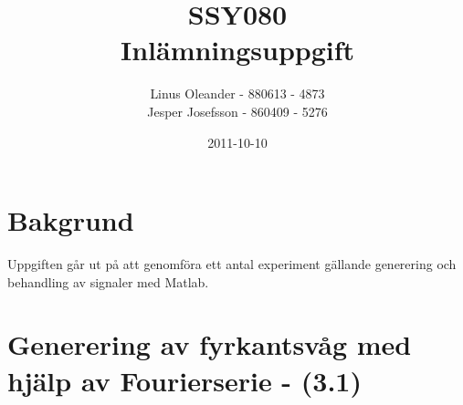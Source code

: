 \documentclass[]{article}
\title{SSY080 \\ Inlämningsuppgift}
\author{
Linus Oleander - 880613 - 4873 \\
Jesper Josefsson - 860409 - 5276 
}
\date{2011-10-10}
\begin{document}
\ifpdf
{}
\else
{}
\fi

\maketitle

\section{Bakgrund}
Uppgiften går ut på att genomföra ett antal experiment gällande generering och behandling av signaler med Matlab.

\section{Generering av fyrkantsvåg med hjälp av Fourierserie - (3.1)}
\end{document}
